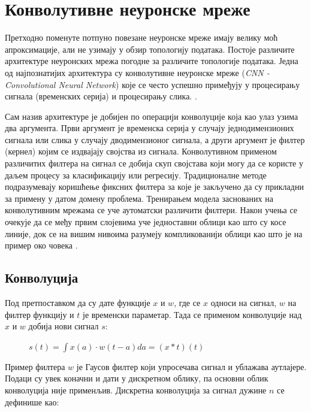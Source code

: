 \documentclass[11pt,oneside]{memoir}
\begin{document}
\section{Конволутивне неуронске мреже}

Претходно поменуте потпуно повезане неуронске мреже имају велику моћ апроксимације, али не узимају у обзир топологију података. Постоје
различите архитектуре неуронских мрежа погодне за различите топологије података. Једна од најпознатијих архитектура су
конволутивне неуронске мреже (\textit{CNN - Convolutional Neural Network}) које се често успешно примеђују у процесирању сигнала (временских
серија) и процесирању слика. \cite{deep_learning_goodfellow}.

Сам назив архитектуре је добијен по операцији конволуције која као улаз узима два аргумента. Први аргумент је временска серија у случају
једнодимензионих сигнала или слика у случају дводимензионог сигнала, а други аргумент је филтер (кернел) којим
се издвајају својства из сигнала. Конволутивном применом
различитих филтера на сигнал се добија скуп својстава који могу да се користе у даљем процесу за класификацију или регресију. Традиционалне
методе подразумевају коришћење фиксних филтера за које је закључено да су прикладни за примену у датом домену проблема. Тренирањем модела
заснованих на конволутивним мрежама се уче аутоматски различити филтери. Након учења се очекује да се међу првим слојевима
уче једноставни облици као што су косе линије, док се на вишим нивоима разумеју компликованији облици као што је на пример око човека
\cite{deep_learning_goodfellow, ml_mladen}.

\subsection{Конволуција}

Под претпоставком да су дате функције $x$ и $w$, где се $x$ односи на сигнал, $w$ на филтер функцију и $t$ је временски параметар.
Тада се применом конволуције над $x$ и $w$ добија нови сигнал $s$:

\begin{figure}[H]
  \centering
  $s(t) = \int x(a)\cdot w(t - a) da = (x*t)(t)$
\end{figure}

Пример филтера $w$ је Гаусов филтер који упросечава сигнал и ублажава аутлајере. Подаци су увек коначни и дати у дискретном облику, 
па основни облик конволуција није применљив. Дискретна конволуција за сигнал дужине $n$ се дефинише као:
\end{document}
